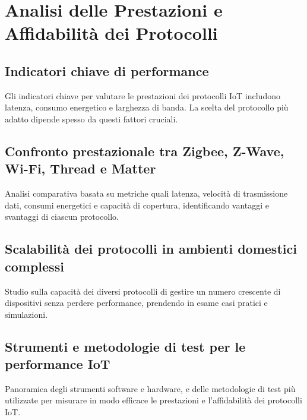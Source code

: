
\chapter{Analisi delle Prestazioni e Affidabilità dei Protocolli}

\section{Indicatori chiave di performance}
Gli indicatori chiave per valutare le prestazioni dei protocolli IoT includono latenza, consumo energetico e larghezza di banda. La scelta del protocollo più adatto dipende spesso da questi fattori cruciali.

\section{Confronto prestazionale tra Zigbee, Z-Wave, Wi-Fi, Thread e Matter}
Analisi comparativa basata su metriche quali latenza, velocità di trasmissione dati, consumi energetici e capacità di copertura, identificando vantaggi e svantaggi di ciascun protocollo.

\section{Scalabilità dei protocolli in ambienti domestici complessi}
Studio sulla capacità dei diversi protocolli di gestire un numero crescente di dispositivi senza perdere performance, prendendo in esame casi pratici e simulazioni.

\section{Strumenti e metodologie di test per le performance IoT}
Panoramica degli strumenti software e hardware, e delle metodologie di test più utilizzate per misurare in modo efficace le prestazioni e l'affidabilità dei protocolli IoT.
